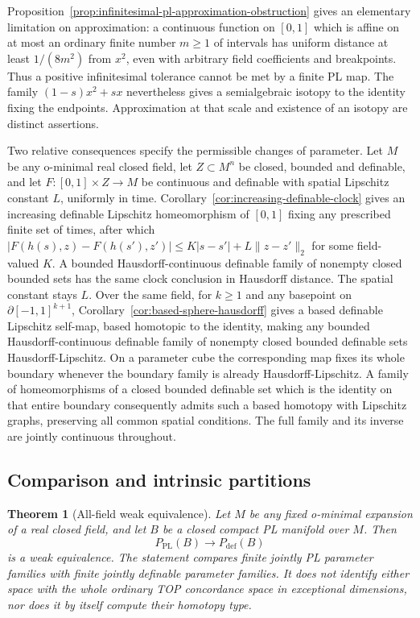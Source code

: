 \documentclass[11pt,a4paper]{article}
\newtheorem{theorem}{Theorem}[section]
\theoremstyle{definition}
\begin{document}
Proposition~\ref{prop:infinitesimal-pl-approximation-obstruction} gives
an elementary limitation on approximation: a continuous function on
$[0,1]$ which is affine on at most an ordinary finite number $m\geq1$
of intervals has uniform distance at least $1/(8m^2)$ from $x^2$,
even with arbitrary field coefficients and breakpoints. Thus a
positive infinitesimal tolerance cannot be met by a finite PL map.
The family $(1-s)x^2+sx$ nevertheless gives a semialgebraic isotopy
to the identity fixing the endpoints. Approximation at that scale
and existence of an isotopy are distinct assertions.

Two relative consequences specify the permissible changes of parameter.
Let $M$ be any o-minimal real closed field, let $Z\subset M^n$ be
closed, bounded and definable, and let $F:[0,1]\times Z\to M$ be
continuous and definable with spatial Lipschitz constant $L$,
uniformly in time. Corollary~\ref{cor:increasing-definable-clock}
gives an increasing definable Lipschitz homeomorphism of $[0,1]$
fixing any prescribed finite set of times, after which
$|F(h(s),z)-F(h(s'),z')|\le K|s-s'|+L\|z-z'\|_2$ for some
field-valued $K$. A bounded Hausdorff-continuous definable family
of nonempty closed bounded sets has the same clock conclusion
in Hausdorff distance. The spatial constant stays $L$.
Over the same field, for $k\ge1$ and any basepoint on
$\partial[-1,1]^{k+1}$, Corollary~\ref{cor:based-sphere-hausdorff}
gives a based definable Lipschitz self-map, based homotopic to
the identity, making any bounded Hausdorff-continuous definable
family of nonempty closed bounded definable sets Hausdorff-Lipschitz. On a parameter
cube the corresponding map fixes its whole boundary whenever
the boundary family is already Hausdorff-Lipschitz. A family of
homeomorphisms of a closed bounded definable set which is the identity
on that entire boundary consequently admits such a based homotopy
with Lipschitz graphs, preserving all common spatial conditions.
The full family and its inverse are jointly continuous throughout.

\subsection{Comparison and intrinsic partitions}
\begin{theorem}[All-field weak equivalence]\label{result-44}
Let $M$ be any fixed o-minimal expansion of a real closed field,
and let $B$ be a closed compact PL manifold over $M$. Then
\begin{equation}
 P_{\mathrm{PL}}(B)\longrightarrow P_{\mathrm{def}}(B)
 \label{equation-115}
\end{equation}
is a weak equivalence. The statement compares finite jointly
PL parameter families with finite jointly definable parameter
families. It does not identify either space with the whole
ordinary TOP concordance space in exceptional dimensions,
nor does it by itself compute their homotopy type.
\end{theorem}
\end{document}
